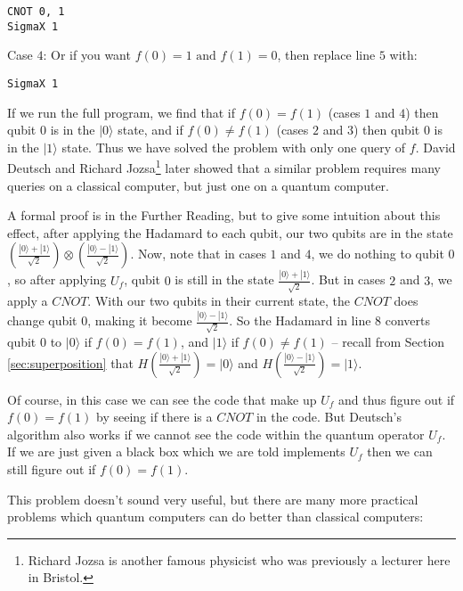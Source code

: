 \documentclass[twocolumn]{article}
\begin{document}
\begin{lstlisting}
CNOT 0, 1
SigmaX 1
\end{lstlisting}

Case $4$: Or if you want $f(0) = 1 \text{ and } f(1) = 0$, then replace line $5$ with:

\begin{lstlisting}
SigmaX 1
\end{lstlisting}

If we run the full program, we find that if $f(0) = f(1)$ (cases $1$ and $4$) then qubit $0$ is in the $|0\rangle$ state, and if $f(0) \neq f(1)$ (cases $2$ and $3$) then qubit $0$ is in the $|1\rangle$ state. Thus we have solved the problem with only one query of $f$. David Deutsch and Richard Jozsa\footnote{Richard Jozsa is another famous physicist who was previously a lecturer here in Bristol.} later showed that a similar problem requires many queries on a classical computer, but just one on a quantum computer.

A formal proof is in the Further Reading, but to give some intuition about this effect, after applying the Hadamard to each qubit, our two qubits are in the state $\left(\frac{|0\rangle + |1\rangle}{\sqrt{2}}\right) \otimes \left(\frac{|0\rangle - |1\rangle}{\sqrt{2}}\right)$. Now, note that in cases $1$ and $4$, we do nothing to qubit $0$, so after applying $U_f$, qubit $0$ is still in the state $\frac{|0\rangle + |1\rangle}{\sqrt{2}}$. But in cases $2$ and $3$, we apply a $CNOT$. With our two qubits in their current state, the $CNOT$ does change qubit $0$, making it become $\frac{|0\rangle - |1\rangle}{\sqrt{2}}$. So the Hadamard in line $8$ converts qubit $0$ to $|0\rangle$ if $f(0) = f(1)$, and $|1\rangle$ if $f(0) \neq f(1)$ -- recall from Section \ref{sec:superposition} that $H\left(\frac{|0\rangle + |1\rangle}{\sqrt{2}}\right) = |0\rangle$ and $H\left(\frac{|0\rangle - |1\rangle}{\sqrt{2}}\right) = |1\rangle$.

Of course, in this case we can see the code that make up $U_f$ and thus figure out if $f(0) = f(1)$ by seeing if there is a $CNOT$ in the code. But Deutsch's algorithm also works if we cannot see the code within the quantum operator $U_f$. If we are just given a black box which we are told implements $U_f$ then we can still figure out if $f(0) = f(1)$.

This problem doesn't sound very useful, but there are many more practical problems which quantum computers can do better than classical computers:
\end{document}
